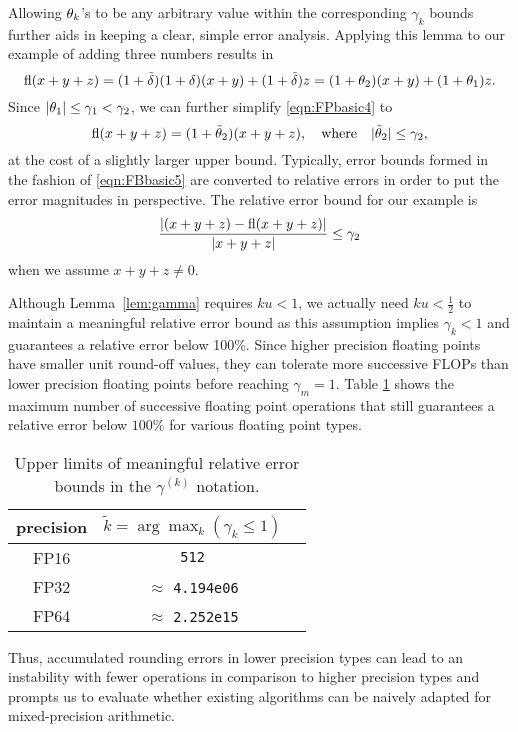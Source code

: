 Allowing $\theta_{k}$'s to be any arbitrary value within the corresponding $\gamma_{k}$ bounds further aids in keeping a clear, simple error analysis. 
Applying this lemma to our example of adding three numbers results in
\begin{equation}
\fl(x+y+z) = (1+\tilde{\dd})(1+\dd) (x+y) + (1+\tilde{\dd})z = (1+\tth_{2})(x+y) + (1+\tth_{1})z. \label{eqn:FPbasic4}
\end{equation}
Since $|\theta_{1}| \leq \gamma_{1} < \gamma_{2}$, we can further simplify \cref{eqn:FPbasic4} to
\begin{equation}
\fl(x+y+z) = (1+\tilde{\tth}_{2})(x+y+z), \quad \mbox{where} \quad |\tilde{\tth}_{2}| \leq \gamma_{2}, \label{eqn:FBbasic5}
\end{equation}
at the cost of a slightly larger upper bound. 
Typically, error bounds formed in the fashion of \cref{eqn:FBbasic5} are converted to relative errors in order to put the error magnitudes in perspective.
The relative error bound for our example is
\begin{equation*}
\frac{|(x+y+z) - \mathrm{fl}(x+y+z)|}{|x+y+z|} \leq \gamma_{2}
\end{equation*}
when we assume $x+y+z\neq 0$.\par

Although Lemma~\ref{lem:gamma} requires $ku<1$, we actually need $ku <\frac{1}{2}$ to maintain a meaningful relative error bound as this assumption implies $\gamma_k < 1$ and guarantees a relative error below 100\%. 
Since higher precision floating points have smaller unit round-off values, they can tolerate more successive FLOPs than lower precision floating points before reaching $\gamma_m=1$. 
Table \ref{table:ieeen} shows the maximum number of successive floating point operations that still guarantees a relative error below $100$\% for various floating point types. 
\begin{table}[h]
	\centering
	\begin{tabular}{||c|c|c||} 
		\hline
		precision &$\tilde{k} = \arg\max_{k}(\gamma_k \leq 1)$ \\ \hline
		FP16 & {\tt 512}\\
		FP32 & $\approx$ {\tt 4.194e06} \\ 
		FP64 &  $\approx$ {\tt 2.252e15}\\ \hline 
	\end{tabular}
	\caption{Upper limits of meaningful relative error bounds in the $\gamma^{(k)}$ notation.}
	\label{table:ieeen}
\end{table}
\vspace*{-10pt}
Thus, accumulated rounding errors in lower precision types can lead to an instability with fewer operations in comparison to higher precision types and prompts us to evaluate whether existing algorithms can be naively adapted for mixed-precision arithmetic. \par


